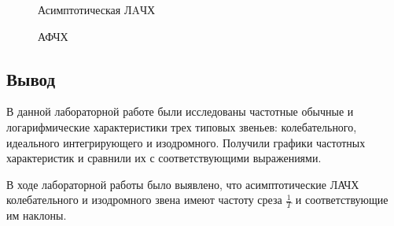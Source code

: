 \documentclass[a4paper, 12pt]{article}
\begin{document}
\newpage

\begin{figure}[h!]
	\caption{Асимптотическая ЛAЧХ}
	\label{3alachh}
\end{figure}
\begin{figure}[h!]
	\caption{АФЧХ}
	\label{3afchh}
\end{figure}

\newpage

\begin{center}
	\section*{Вывод}
\end{center}\par
В данной лабораторной работе были исследованы частотные обычные и логарифмические характеристики трех типовых звеньев: колебательного, идеального интегрирующего и изодромного. Получили графики частотных характеристик и сравнили их с соответствующими выражениями. \par
В ходе лабораторной работы было выявлено, что асимптотические ЛАЧХ колебательного и изодромного звена имеют частоту среза $\frac{1}{T}$ и соответствующие им наклоны.
\end{document}
